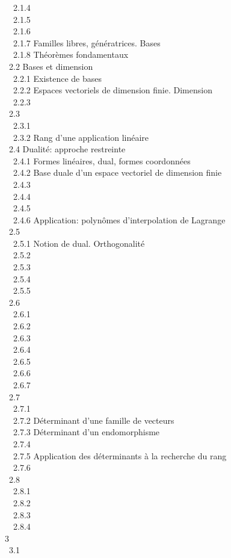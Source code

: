 \documentclass[]{article}
\begin{document}
~~2.1.4  \\
~~2.1.5  \\
~~2.1.6  \\ ~~2.1.7
{Familles libres, génératrices.
Bases} \\ ~~2.1.8 {Théorèmes
fondamentaux} \\ ~2.2 {Bases et
dimension} \\ ~~2.2.1 {Existence de
bases} \\ ~~2.2.2 {Espaces
vectoriels de dimension finie. Dimension} \\ ~~2.2.3
 \\ ~2.3
 \\ ~~2.3.1
 \\
~~2.3.2 {Rang d'une application
linéaire} \\ ~2.4 {Dualité: approche
restreinte} \\ ~~2.4.1 {Formes
linéaires, dual, formes coordonnées} \\ ~~2.4.2
{Base duale d'un espace vectoriel
de dimension finie} \\ ~~2.4.3
 \\ ~~2.4.4
 \\ ~~2.4.5
 \\ ~~2.4.6
{Application: polynômes
d'interpolation de Lagrange} \\ ~2.5
 \\
~~2.5.1 {Notion de dual.
Orthogonalité} \\ ~~2.5.2
 \\ ~~2.5.3
 \\ ~~2.5.4
 \\ ~~2.5.5
 \\
~2.6  \\ ~~2.6.1
 \\ ~~2.6.2
 \\ ~~2.6.3
 \\ ~~2.6.4
 \\ ~~2.6.5
 \\ ~~2.6.6
 \\ ~~2.6.7
 \\
~2.7  \\ ~~2.7.1
 \\ ~~2.7.2
{Déterminant d'une famille de
vecteurs} \\ ~~2.7.3 {Déterminant
d'un endomorphisme} \\ ~~2.7.4
 \\
~~2.7.5 {Application des
déterminants à la recherche du rang} \\ ~~2.7.6
 \\
~2.8  \\ ~~2.8.1
 \\ ~~2.8.2
 \\ ~~2.8.3
 \\
~~2.8.4  \\ 3
 \\ ~3.1
\end{document}
